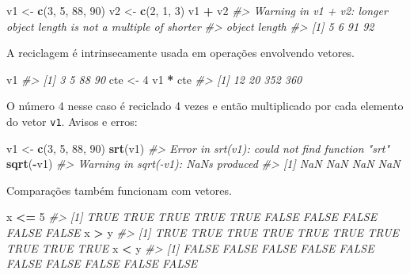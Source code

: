 \documentclass[]{book}
\newenvironment{Shaded}{\begin{snugshade}}{\end{snugshade}}
\newcommand{\KeywordTok}[1]{\textcolor[rgb]{0.13,0.29,0.53}{\textbf{#1}}}
\newcommand{\DecValTok}[1]{\textcolor[rgb]{0.00,0.00,0.81}{#1}}
\newcommand{\StringTok}[1]{\textcolor[rgb]{0.31,0.60,0.02}{#1}}
\newcommand{\CommentTok}[1]{\textcolor[rgb]{0.56,0.35,0.01}{\textit{#1}}}
\newcommand{\OperatorTok}[1]{\textcolor[rgb]{0.81,0.36,0.00}{\textbf{#1}}}
\newcommand{\NormalTok}[1]{#1}
\begin{document}
\begin{Shaded}
\begin{Highlighting}[]
\NormalTok{v1 <-}\StringTok{ }\KeywordTok{c}\NormalTok{(}\DecValTok{3}\NormalTok{, }\DecValTok{5}\NormalTok{, }\DecValTok{88}\NormalTok{, }\DecValTok{90}\NormalTok{)}
\NormalTok{v2 <-}\StringTok{ }\KeywordTok{c}\NormalTok{(}\DecValTok{2}\NormalTok{, }\DecValTok{1}\NormalTok{, }\DecValTok{3}\NormalTok{)}
\NormalTok{v1 }\OperatorTok{+}\StringTok{ }\NormalTok{v2}
\CommentTok{#> Warning in v1 + v2: longer object length is not a multiple of shorter}
\CommentTok{#> object length}
\CommentTok{#> [1]  5  6 91 92}
\end{Highlighting}
\end{Shaded}

A reciclagem é intrinsecamente usada em operações envolvendo vetores.

\begin{Shaded}
\begin{Highlighting}[]
\NormalTok{v1}
\CommentTok{#> [1]  3  5 88 90}
\NormalTok{cte <-}\StringTok{ }\DecValTok{4}
\NormalTok{v1 }\OperatorTok{*}\StringTok{ }\NormalTok{cte}
\CommentTok{#> [1]  12  20 352 360}
\end{Highlighting}
\end{Shaded}

O número 4 nesse caso é reciclado 4 vezes e então multiplicado por cada
elemento do vetor \texttt{v1}. Avisos e erros:

\begin{Shaded}
\begin{Highlighting}[]
\NormalTok{v1 <-}\StringTok{ }\KeywordTok{c}\NormalTok{(}\DecValTok{3}\NormalTok{, }\DecValTok{5}\NormalTok{, }\DecValTok{88}\NormalTok{, }\DecValTok{90}\NormalTok{)}
\KeywordTok{srt}\NormalTok{(v1)}
\CommentTok{#> Error in srt(v1): could not find function "srt"}
\KeywordTok{sqrt}\NormalTok{(}\OperatorTok{-}\NormalTok{v1)}
\CommentTok{#> Warning in sqrt(-v1): NaNs produced}
\CommentTok{#> [1] NaN NaN NaN NaN}
\end{Highlighting}
\end{Shaded}

Comparações também funcionam com vetores.

\begin{Shaded}
\begin{Highlighting}[]
\NormalTok{x }\OperatorTok{<=}\StringTok{ }\DecValTok{5}
\CommentTok{#>  [1]  TRUE  TRUE  TRUE  TRUE  TRUE FALSE FALSE FALSE FALSE FALSE}
\NormalTok{x }\OperatorTok{>}\StringTok{ }\NormalTok{y}
\CommentTok{#>  [1] TRUE TRUE TRUE TRUE TRUE TRUE TRUE TRUE TRUE TRUE}
\NormalTok{x }\OperatorTok{<}\StringTok{ }\NormalTok{y}
\CommentTok{#>  [1] FALSE FALSE FALSE FALSE FALSE FALSE FALSE FALSE FALSE FALSE}
\end{Highlighting}
\end{Shaded}
\end{document}

